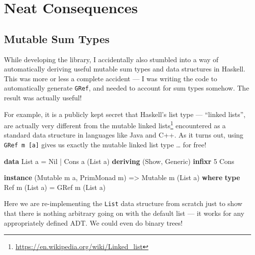 \documentclass[]{article}
\newenvironment{Shaded}{}{}
\newcommand{\DataTypeTok}[1]{\textcolor[rgb]{0.56,0.13,0.00}{#1}}
\newcommand{\DecValTok}[1]{\textcolor[rgb]{0.25,0.63,0.44}{#1}}
\newcommand{\KeywordTok}[1]{\textcolor[rgb]{0.00,0.44,0.13}{\textbf{#1}}}
\newcommand{\NormalTok}[1]{#1}
\newcommand{\OperatorTok}[1]{\textcolor[rgb]{0.40,0.40,0.40}{#1}}
\newcommand{\OtherTok}[1]{\textcolor[rgb]{0.00,0.44,0.13}{#1}}
\renewcommand{\href}[2]{#2\footnote{\url{#1}}}
\begin{document}
\hypertarget{neat-consequences}{%
\section{Neat Consequences}\label{neat-consequences}}

\hypertarget{mutable-sum-types}{%
\subsection{Mutable Sum Types}\label{mutable-sum-types}}

While developing the library, I accidentally also stumbled into a way of
automatically deriving useful mutable sum types and data structures in Haskell.
This was more or less a complete accident --- I was writing the code to
automatically generate \texttt{GRef}, and needed to account for sum types
somehow. The result was actually useful!

For example, it is a publicly kept secret that Haskell's list type --- ``linked
lists'', are actually very different from the
\href{https://en.wikipedia.org/wiki/Linked_list}{mutable linked lists}
encountered as a standard data structure in languages like Java and C++. As it
turns out, using \texttt{GRef\ m\ {[}a{]}} gives us exactly the mutable linked
list type \ldots{} for free!

\begin{Shaded}
\begin{Highlighting}[]
\KeywordTok{data} \DataTypeTok{List}\NormalTok{ a }\OtherTok{=} \DataTypeTok{Nil} \OperatorTok{|} \DataTypeTok{Cons}\NormalTok{ a (}\DataTypeTok{List}\NormalTok{ a)}
  \KeywordTok{deriving}\NormalTok{ (}\DataTypeTok{Show}\NormalTok{, }\DataTypeTok{Generic}\NormalTok{)}
\KeywordTok{infixr} \DecValTok{5} \OtherTok{\textasciigrave{}Cons\textasciigrave{}}

\KeywordTok{instance}\NormalTok{ (}\DataTypeTok{Mutable}\NormalTok{ m a, }\DataTypeTok{PrimMonad}\NormalTok{ m) }\OtherTok{=>} \DataTypeTok{Mutable}\NormalTok{ m (}\DataTypeTok{List}\NormalTok{ a) }\KeywordTok{where}
    \KeywordTok{type} \DataTypeTok{Ref}\NormalTok{ m (}\DataTypeTok{List}\NormalTok{ a) }\OtherTok{=} \DataTypeTok{GRef}\NormalTok{ m (}\DataTypeTok{List}\NormalTok{ a)}
\end{Highlighting}
\end{Shaded}

Here we are re-implementing the \texttt{List} data structure from scratch just
to show that there is nothing arbitrary going on with the default list --- it
works for any appropriately defined ADT. We could even do binary trees!
\end{document}

